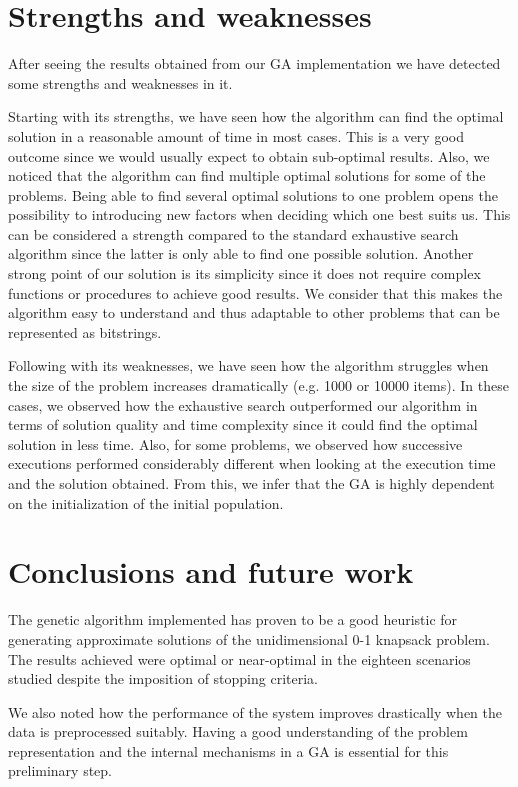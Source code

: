 \documentclass[anon]{CI}
\begin{document}
\section{Strengths and weaknesses} \label{sec:strengths}

After seeing the results obtained from our GA implementation we have detected some strengths and weaknesses in it.

Starting with its strengths, we have seen how the algorithm can find the optimal solution in a reasonable amount of time in most cases. This is a very good outcome since we would usually expect to obtain sub-optimal results. Also, we noticed that the algorithm can find multiple optimal solutions for some of the problems. Being able to find several optimal solutions to one problem opens the possibility to introducing new factors when deciding which one best suits us. This can be considered a strength compared to the standard exhaustive search algorithm since the latter is only able to find one possible solution. Another strong point of our solution is its simplicity since it does not require complex functions or procedures to achieve good results. We consider that this makes the algorithm easy to understand and thus adaptable to other problems that can be represented as bitstrings.

Following with its weaknesses, we have seen how the algorithm struggles when the size of the problem increases dramatically (e.g. 1000 or 10000 items). In these cases, we observed how the exhaustive search outperformed our algorithm in terms of solution quality and time complexity since it could find the optimal solution in less time. Also, for some problems, we observed how successive executions performed considerably different when looking at the execution time and the solution obtained. From this, we infer that the GA is highly dependent on the initialization of the initial population.

\section{Conclusions and future work}

The genetic algorithm implemented has proven to be a good heuristic for generating approximate solutions of the unidimensional 0-1 knapsack problem. The results achieved were optimal or near-optimal in the eighteen scenarios studied despite the imposition of stopping criteria. 

We also noted how the performance of the system improves drastically when the data is preprocessed suitably. Having a good understanding of the problem representation and the internal mechanisms in a GA is essential for this preliminary step.
\end{document}

